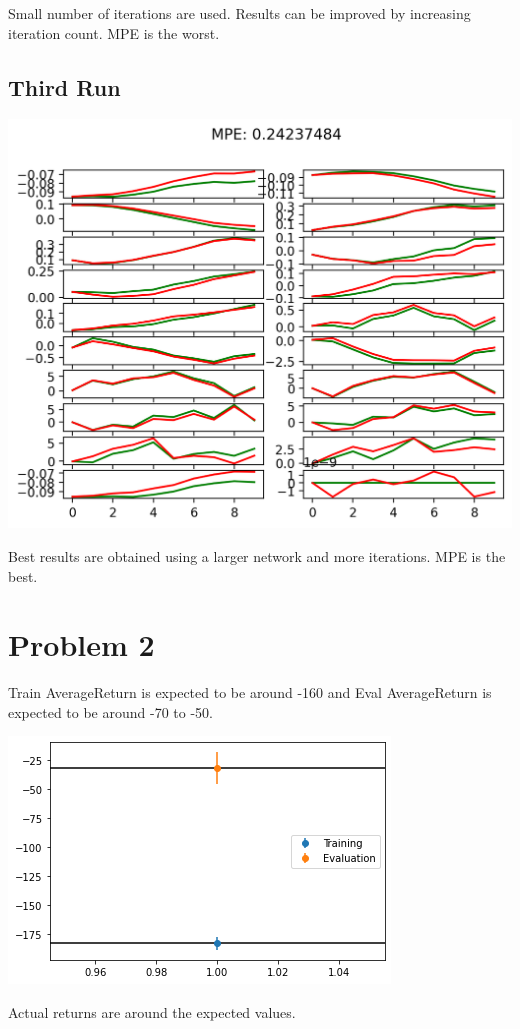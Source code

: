 \documentclass[11pt]{article}
\begin{document}
    Small number of iterations are used.
    Results can be improved by increasing iteration count.
    MPE is the worst.

    \subsection*{Third Run}

    \includegraphics[scale=0.9]{q1/itr_0_predictions_run2}

    Best results are obtained using a larger network and more iterations.
    MPE is the best.

    \section*{Problem 2}

    Train AverageReturn is expected to be around -160 and Eval AverageReturn is expected to be around -70 to -50.

    \includegraphics[scale=0.9]{q2/q2}

    Actual returns are around the expected values.
\end{document}
